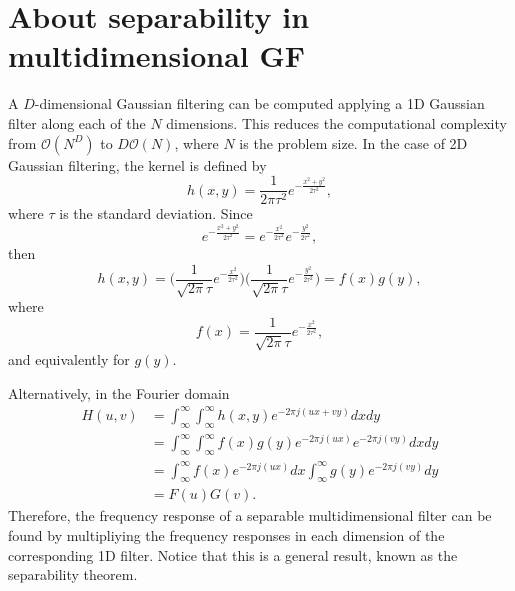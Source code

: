\documentclass{article}
\begin{document}
\section{About separability in multidimensional GF}
\label{ape:GF_separability}

A $D$-dimensional Gaussian filtering can be computed applying a 1D
Gaussian filter along each of the $N$ dimensions. This reduces the
computational complexity from $\mathcal{O}(N^D)$ to $D\mathcal{O}(N)$,
where $N$ is the problem size. In the case of 2D Gaussian filtering,
the kernel is defined by
\begin{equation}
  h(x,y) = \frac{1}{2\pi\tau^2}e^{-\frac{x^2+y^2}{2\tau^2}},
  \label{eq:2DGF}
\end{equation}
where $\tau$ is the standard deviation. Since
\begin{equation*}
  e^{-\frac{x^2+y^2}{2\tau^2}} = e^{-\frac{x^2}{2\tau^2}}e^{-\frac{y^2}{2\tau^2}},
\end{equation*}
then
\begin{equation}
  h(x,y) = \Big(\frac{1}{\sqrt{2\pi}\tau}e^{-\frac{x^2}{2\tau^2}}\Big)\Big(\frac{1}{\sqrt{2\pi}\tau}e^{-\frac{y^2}{2\tau^2}}\Big) = f(x)g(y),
\end{equation}
where
\begin{equation}
  f(x) = \frac{1}{\sqrt{2\pi}\tau}e^{-\frac{x^2}{2\tau^2}},
\end{equation}
and equivalently for $g(y)$.

Alternatively, in the Fourier domain
\begin{equation*}
  \begin{split}
    H(u,v) & = \int_\infty^\infty\int_\infty^\infty h(x,y)e^{-2\pi j(ux+vy)}dxdy \\
           & = \int_\infty^\infty\int_\infty^\infty f(x)g(y)e^{-2\pi j(ux)}e^{-2\pi j(vy)}dxdy \\
           & = \int_\infty^\infty f(x)e^{-2\pi j(ux)} dx \int_\infty^\infty g(y) e^{-2\pi j(vy)} dy \\
           & = F(u)G(v).
  \end{split}
\end{equation*}
Therefore, the frequency response of a separable multidimensional
filter can be found by multipliying the frequency responses in each
dimension of the corresponding 1D filter. Notice that this is a
general result, known as the separability theorem.

\end{document}
